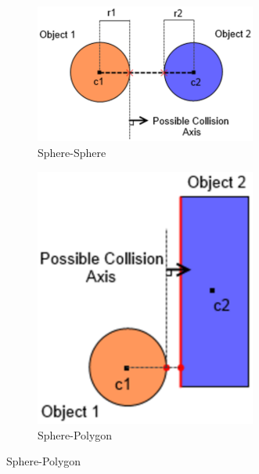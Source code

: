 \documentclass[a4paper]{article}
\begin{document}
\begin{figure}[h]
  \centering

  \begin{subfigure}[b]{0.4\textwidth}
    \centering
    \includegraphics[width=0.8\textwidth]{graphics/colldet_sat_sphere_sphere.eps}
    \caption{Sphere-Sphere}
  \end{subfigure}
  \begin{subfigure}[b]{0.3\textwidth}
    \centering
    \includegraphics[width=0.8\textwidth]{graphics/colldet_sat_sphere_polygon.eps}
    \caption{Sphere-Polygon}
  \end{subfigure}

  \label{fig:colldet_sat_curves}
\end{figure}
\FloatBarrier
\end{document}
